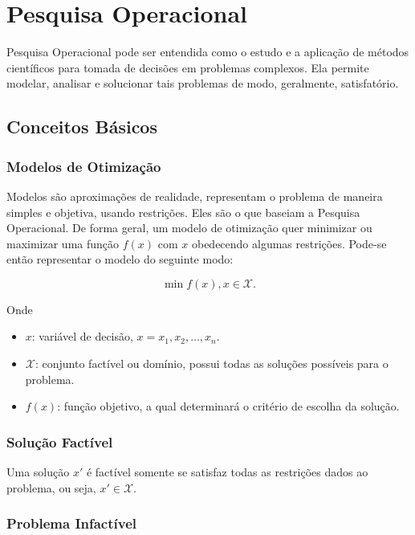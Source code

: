 \chapter{Pesquisa Operacional}\label{ch:pesquisa-operacional}


Pesquisa Operacional pode ser entendida como o estudo e a aplicação de métodos científicos para tomada de decisões em problemas complexos.
Ela permite modelar, analisar e solucionar tais problemas de modo, geralmente, satisfatório.


\section{Conceitos Básicos}\label{sec:conceitos-basicos}

\subsection{Modelos de Otimização}\label{subsec:modelos-de-otimizacao}

Modelos são aproximações de realidade, representam o problema de maneira simples e objetiva, usando restrições.
Eles são o que baseiam a Pesquisa Operacional.
De forma geral, um modelo de otimização quer minimizar ou maximizar uma função $f(x)$ com $x$ obedecendo algumas restrições.
Pode-se então representar o modelo do seguinte modo:

\[
    \min f(x), x \in \mathcal{X}.
\]

Onde

\begin{itemize}
    \item $x$: variável de decisão, $x = x_1, x_2, \dots, x_n$.
    \item $\mathcal{X}$: conjunto factível ou domínio, possui todas as soluções possíveis para o problema.
    \item $f(x)$: função objetivo, a qual determinará o critério de escolha da solução.
\end{itemize}

\subsection{Solução Factível}\label{subsec:solucao-factivel}

Uma solução $x'$ é factível somente se satisfaz todas as restrições dados ao problema, ou seja, $x' \in \mathcal{X}$.

\subsection{Problema Infactível}\label{subsec:solucao-infactivel}

